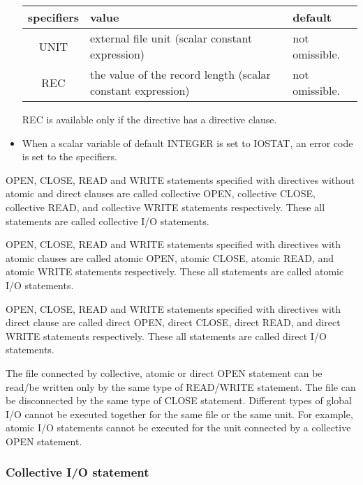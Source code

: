\begin{itemize}
   \begin{table}[h]
    \begin{center}
     \label{tb:globalopen}
     \begin{tabular}{|c||p{90mm}|l|}
       \hline
      specifiers & value & default \\ \hline \hline
      UNIT & external file unit (scalar constant expression)
	  & not omissible. \\ \hline
      REC & the value of the record length (scalar constant expression)
	  & not omissible. \\ \hline
     \end{tabular}
    \end{center}
   \end{table}

   REC is available only if the directive has a directive clause.
   
   \item When a scalar variable of default INTEGER is set to IOSTAT, an
     error code is set to the specifiers.
	 
   \end{itemize}

   OPEN, CLOSE, READ and WRITE statements specified with \gio directives
   without atomic and direct clauses are called collective OPEN, collective
   CLOSE, collective READ, and collective WRITE statements respectively.
   These all statements are called collective I/O statements.

   OPEN, CLOSE, READ and WRITE statements specified with \gio directives
   with atomic clauses are called atomic OPEN, atomic CLOSE, atomic READ, and
   atomic WRITE statements respectively.
   These all statements are called atomic I/O statements.

   OPEN, CLOSE, READ and WRITE statements specified with \gio directives
   with direct clause are called direct OPEN, direct CLOSE, direct READ, and
   direct WRITE statements respectively.
   These all statements are called direct I/O statements.

   The file connected by collective, atomic or direct OPEN statement can
   be read/be written only by the same type of READ/WRITE statement.
   The file can be disconnected by the same type of CLOSE statement.
   Different types of global I/O cannot be executed together for the same file or the
   same unit.
   For example, atomic I/O statements cannot be executed for the unit
   connected by a collective OPEN statement.


   \subsubsection{Collective I/O statement}

